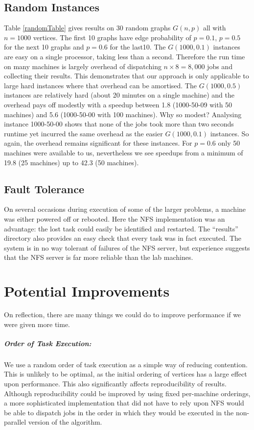 \documentclass{l4proj}
\begin{document}
\section{Random Instances}
Table \ref{randomTable} gives results on 30 random graphs $G(n,p)$ all with $n = 1000$ vertices. The first 10 graphs have
edge probability of $p = 0.1$, $p = 0.5$ for the next 10 graphs and $p = 0.6$ for the last10. 
The $G(1000,0.1)$ instances are easy on a single processor,
taking less than a second. Therefore the run time on many machines is largely overhead of dispatching $n \times 8 = 8,000$ jobs and collecting 
their results. This demonstrates that our approach is only applicable to large hard instances where that overhead can be amortised.
The $G(1000,0.5)$ instances are relatively hard (about 20 minutes on a single machine) and the overhead pays off modestly
with a speedup between 1.8 (1000-50-09 with 50 machines) and 5.6 (1000-50-00 with 100 machines). Why so modest? Analysing instance
1000-50-00 shows that none of the jobs took more than two seconds runtime yet incurred the same overhead as the easier $G(1000,0.1)$
instances. So again, the overhead remains significant for these instances. For $p = 0.6$ only 50 machines were available to us,
nevertheless we see speedups from a minimum of 19.8 (25 machines) up to 42.3 (50 machines).

\section{Fault Tolerance}
On several occasions during execution of some of the larger problems, a machine
was either powered off or rebooted. Here the NFS implementation was an
advantage: the lost task could easily be identified and restarted. The
``results'' directory also provides an easy check that every task was in fact
executed. The system is in no way tolerant of failures of the NFS server, but experience
suggests that the NFS server is far more reliable than the lab machines.

%
\chapter{Potential Improvements}
\label{sec:improvements}
\vspace{-1.5mm}
On reflection, there are many things we could do to improve performance if we were given more time.

\paragraph{Order of Task Execution:}
We use a random order of task execution as a simple way of reducing contention.
This is unlikely to be optimal, as the initial ordering of vertices has a large
effect upon performance. This also significantly affects reproducibility of
results.  Although reproducibility could be improved by using fixed per-machine
orderings, a more sophisticated implementation that did not have to rely upon
NFS would be able to dispatch jobs in the order in which they would be executed
in the non-parallel version of the algorithm.
\end{document}
